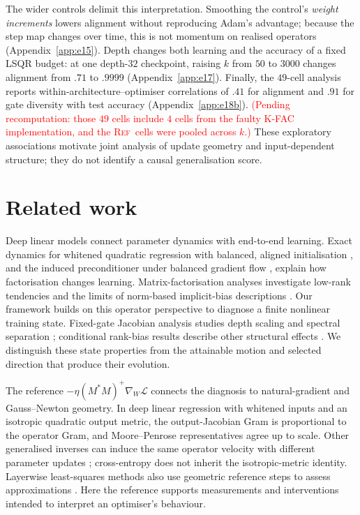 \documentclass{article}
\newcommand{\nat}[1]{\textcolor{red}{#1}}
\newcommand{\TOU}{\textsc{Ref}}
\theoremstyle{definition}
\theoremstyle{remark}
\begin{document}
The wider controls delimit this interpretation. Smoothing the control's \emph{weight increments} lowers alignment without reproducing Adam's advantage; because the step map changes over time, this is not momentum on realised operators (Appendix~\ref{app:e15}). Depth changes both learning and the accuracy of a fixed LSQR budget: at one depth-$32$ checkpoint, raising $k$ from $50$ to $3000$ changes alignment from $.71$ to $.9999$ (Appendix~\ref{app:e17}). Finally, the $49$-cell analysis reports within-architecture--optimiser correlations of $.41$ for alignment and $.91$ for gate diversity with test accuracy (Appendix~\ref{app:e18b}). \nat{(Pending recomputation: those $49$ cells include $4$ cells from the faulty K-FAC implementation, and the \TOU\ cells were pooled across $k$.)} These exploratory associations motivate joint analysis of update geometry and input-dependent structure; they do not identify a causal generalisation score.

\section{Related work}
\label{sec:related}

Deep linear models connect parameter dynamics with end-to-end learning. Exact dynamics for whitened quadratic regression with balanced, aligned initialisation \citep{saxe2014exact}, and the induced preconditioner under balanced gradient flow \citep{arora2018optimization}, explain how factorisation changes learning. Matrix-factorisation analyses investigate low-rank tendencies and the limits of norm-based implicit-bias descriptions \citep{gunasekar2017implicit,arora2019implicit,razin2020implicit,li2021towards}. Our framework builds on this operator perspective to diagnose a finite nonlinear training state. Fixed-gate Jacobian analysis studies depth scaling and spectral separation \citep{haas2026why}; conditional rank-bias results describe other structural effects \citep{timor2023implicit,jacot2023implicit}. We distinguish these state properties from the attainable motion and selected direction that produce their evolution.

The reference $-\eta(M^*M)^+\nabla_W\mathcal L$ connects the diagnosis to natural-gradient and Gauss--Newton geometry. In deep linear regression with whitened inputs and an isotropic quadratic output metric, the output-Jacobian Gram is proportional to the operator Gram, and Moore--Penrose representatives agree up to scale. Other generalised inverses can induce the same operator velocity with different parameter updates \citep{bernacchia2018exact}; cross-entropy does not inherit the isotropic-metric identity. Layerwise least-squares methods also use geometric reference steps to assess approximations \citep{dufortlabbe2026layerwise}. Here the reference supports measurements and interventions intended to interpret an optimiser's behaviour.
\end{document}
